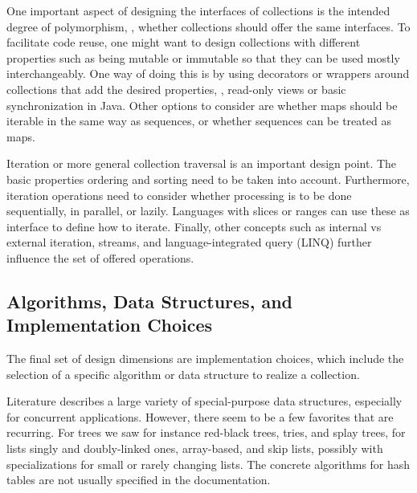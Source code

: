\documentclass[sigconf, 10pt]{acmart}
\begin{document}

One important aspect of designing the interfaces of collections is the intended
degree of polymorphism,
\ie, whether collections should offer the same interfaces.
To facilitate code reuse, one might want to design collections
with different properties such as being mutable or immutable
so that they can be used mostly interchangeably.
One way of doing this is by using decorators or wrappers around collections
that add the desired properties, \eg, read-only views or basic synchronization in Java.
Other options to consider are whether maps should be iterable
in the same way as sequences, or whether sequences can be treated as maps.


Iteration or more general collection traversal is an important design point.
The basic properties ordering and sorting need to be taken into account.
Furthermore, iteration operations need to consider whether processing is
to be done sequentially, in parallel, or lazily.
Languages with slices or ranges can use these as interface
to define how to iterate.
Finally, other concepts such as internal vs external iteration, streams,
and language-integrated query (LINQ)
further influence the set of offered operations.

\subsection{Algorithms, Data Structures, and Implementation Choices}
\label{sec:impl-choices}

The final set of design dimensions are implementation choices,
which include the selection of a specific algorithm or data structure
to realize a collection.

Literature describes a large variety of special-purpose
data structures\citep{Pugh:1998:SkipList,Hinze:2006:Finger,Brodal:2013:PQ,Steindorfer:2015:OHM}, especially for concurrent applications\citep{Hendler:2004:SLS,1377094,1146165,InsertionTreePhasers,Prokopec:2018:CCL}.
However, there seem to be a few favorites that are recurring.
For
trees we saw for instance red-black trees, tries, and splay trees,
for lists singly and doubly-linked ones, array-based, and skip lists,
possibly with specializations for small or rarely changing lists.
%
The concrete algorithms for hash tables are not usually specified
in the documentation.
\end{document}
